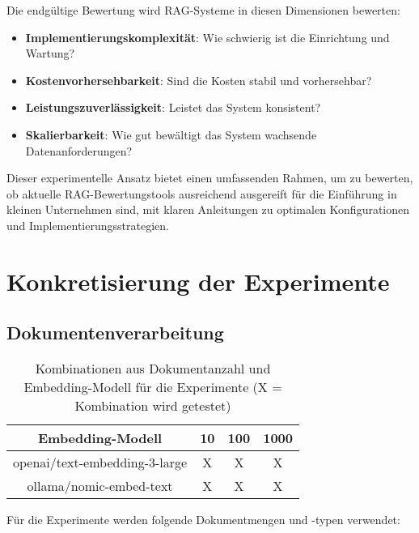 Die endgültige Bewertung wird RAG-Systeme in diesen Dimensionen bewerten:
\begin{itemize}
    \item \textbf{Implementierungskomplexität}: Wie schwierig ist die Einrichtung und Wartung?
    \item \textbf{Kostenvorhersehbarkeit}: Sind die Kosten stabil und vorhersehbar?
    \item \textbf{Leistungszuverlässigkeit}: Leistet das System konsistent?
    \item \textbf{Skalierbarkeit}: Wie gut bewältigt das System wachsende Datenanforderungen?
\end{itemize}

Dieser experimentelle Ansatz bietet einen umfassenden Rahmen, um zu bewerten, ob aktuelle RAG-Bewertungstools ausreichend ausgereift für die Einführung in kleinen Unternehmen sind, mit klaren Anleitungen zu optimalen Konfigurationen und Implementierungsstrategien.

\section{Konkretisierung der Experimente}

\subsection{Dokumentenverarbeitung}
\begin{table}[htbp]
    \centering
    \begin{tabular}{|c|c|c|c|}
        \hline
        \textbf{Embedding-Modell} & \textbf{10} & \textbf{100} & \textbf{1000} \\
        \hline
        openai/text-embedding-3-large & X & X & X \\
        ollama/nomic-embed-text       & X & X & X \\
        \hline
    \end{tabular}
    \caption{Kombinationen aus Dokumentanzahl und Embedding-Modell für die Experimente (X = Kombination wird getestet)}
    \label{tab:dokument-erstellung}
\end{table}

Für die Experimente werden folgende Dokumentmengen und -typen verwendet:

